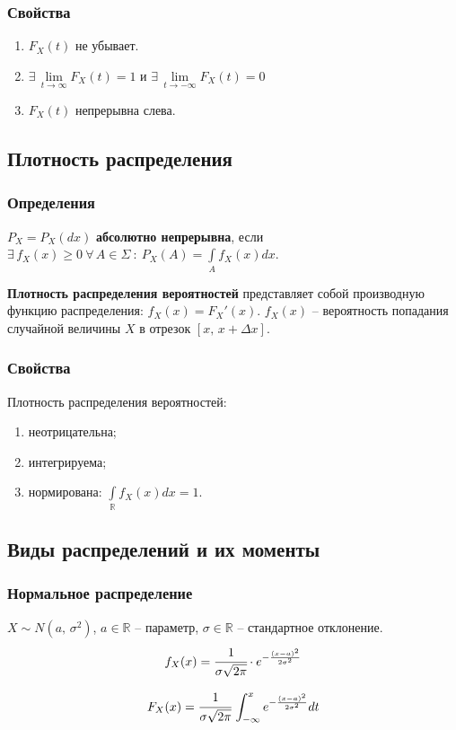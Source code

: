 \documentclass{article}
\newcommand{\R}{\mathbb{R}}
\begin{document}
\subsubsection{Свойства}
\begin{enumerate}
    \item $F_X(t)$ не убывает.
    \item $ \exists\,\lim\limits_{t\to\infty}F_X(t)=1 $ и $\exists\,\lim\limits_{t\to-\infty}F_X(t)=0$
    \item $F_X(t)$ непрерывна слева.
\end{enumerate}
\subsection{Плотность распределения}
\subsubsection{Определения}
$P_X=P_X(dx)$ \textbf{абсолютно непрерывна}, если $\exists\,f_X(x)\geq 0\:\forall\,A\in\Sigma\::\:P_X(A)=\int\limits_A f_X(x)dx$.

\textbf{Плотность распределения вероятностей} представляет собой производную функцию распределения: $f_X(x)=F_X'(x)$. $f_X(x)$ -- вероятность попадания случайной величины $X$ в отрезок $[x,\,x+\Delta x]$.

\subsubsection{Свойства}
Плотность распределения вероятностей:
\begin{enumerate}
    \item неотрицательна;
    \item интегрируема;
    \item нормирована: $\int\limits_{\R}f_X(x)dx=1$.
\end{enumerate}
\subsection{Виды распределений и их моменты}
\subsubsection{Нормальное распределение}
$X \sim N(a,\,\sigma^2)$, $a\in\R$ -- параметр, $\sigma\in\R$ -- стандартное отклонение.
$$ f_X(x)=\cfrac{1}{\sigma\sqrt{2\pi}}\cdot e^{-\frac{(x-a)^2}{2\sigma^2}} $$

$$F_X(x)=\cfrac{1}{\sigma\sqrt{2\pi}}\,\int_{-\infty}^x e^{-\frac{(x-a)^2}{2\sigma^2}}dt$$
\end{document}
